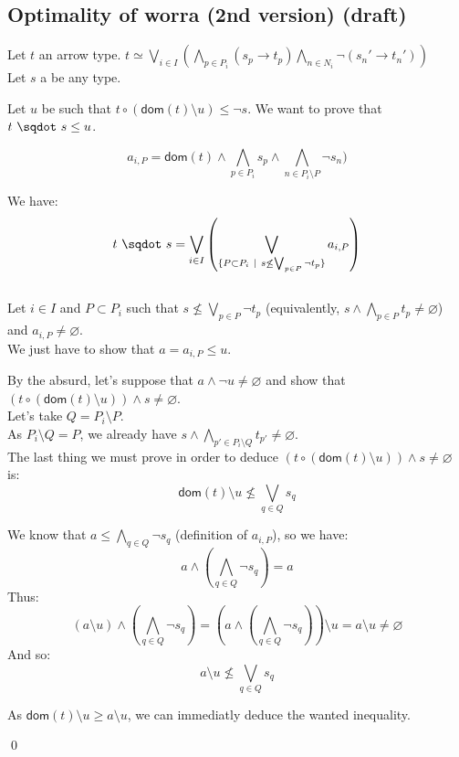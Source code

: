 \documentclass[a4paper]{article}%
\newcommand{\worra}[2]{#1\mathop{\,\sqdot\,} #2}
\newcommand{\apply}[2]{#1\circ#2}
\newcommand{\dom}[1]{\textsf{dom}(#1)}
\newcommand{\alt}{~|~}
\begin{document}
    \subsection{Optimality of worra (2nd version) (draft)}

    Let $t$ an arrow type. $t \simeq \bigvee_{i\in I}\left(\bigwedge_{p\in P_i}(s_p\to t_p)\bigwedge_{n\in N_i}\neg(s_n'\to t_n')\right)$\\
    Let $s$ a be any type.

    Let $u$ be such that $\apply t {(\dom t \setminus u)} \leq \neg s$. We want to prove that $\worra t s \leq u$.

    \[a_{i,P}=\dom t \land \bigwedge_{p\in P_i} s_p \land \bigwedge_{n \in P_i \setminus P} \neg s_n)\]

    We have:
    \[\worra t s = \bigvee_{i \in I} \left(\bigvee_{\{P \subset P_i\alt s \not\leq \bigvee_{p \in P} \neg t_p \} } a_{i,P}\right) \]\\

    Let $i \in I$ and $P \subset P_i$ such that $s \not\leq \bigvee_{p \in P} \neg t_p$ (equivalently, $s \land \bigwedge_{p \in P} t_p \neq \varnothing$) and $a_{i,P} \neq \varnothing$.\\
    We just have to show that $a = a_{i,P} \leq u$.

    By the absurd, let's suppose that $a \land \neg u \neq \varnothing$ and show that $(\apply t {(\dom t \setminus u)}) \land s \neq \varnothing$.\\

    Let's take $Q = P_i \setminus P$.\\

    As $P_i \setminus Q = P$, we already have $s \land \bigwedge_{p'\in P_i\setminus Q}t_{p'} \neq \varnothing$.\\
    The last thing we must prove in order to deduce $(\apply t {(\dom t \setminus u)}) \land s \neq \varnothing$ is:\\
    \[ \dom t \setminus u \not\leq \bigvee_{q\in Q}s_q \]

    We know that $a \leq \bigwedge_{q \in Q} \neg s_q$ (definition of $a_{i,P}$), so we have:
    \[a \land (\bigwedge_{q\in Q} \neg s_q) = a\]
    Thus: \[(a \setminus u) \land (\bigwedge_{q\in Q} \neg s_q) = (a \land (\bigwedge_{q\in Q} \neg s_q)) \setminus u = a \setminus u \neq \varnothing\]
    And so: \[ a \setminus u \not\leq \bigvee_{q\in Q}s_q \]

    As $ \dom t \setminus u \geq a \setminus u$, we can immediatly deduce the wanted inequality.

    \qed
    \pagebreak
\end{document}
